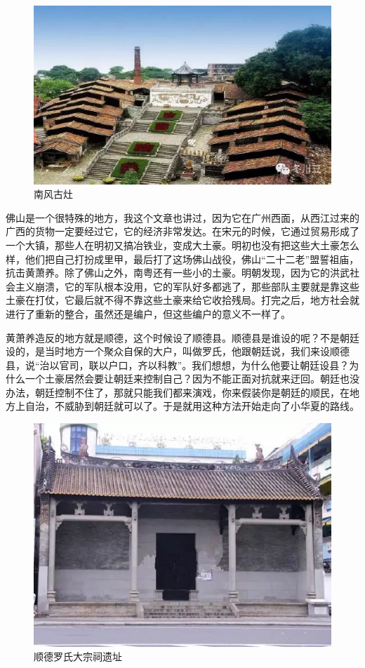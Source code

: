 \begin{figure}
	\centering
	\includegraphics[width=\textwidth]{images/image-50}
	\caption{南风古灶}
\end{figure}

佛山是一个很特殊的地方，我这个文章也讲过，因为它在广州西面，从西江过来的广西的货物一定要经过它，它的经济非常发达。在宋元的时候，它通过贸易形成了一个大镇，那些人在明初又搞冶铁业，变成大土豪。明初也没有把这些大土豪怎么样，他们把自己打扮成里甲，最后打了这场佛山战役，佛山“二十二老”盟誓祖庙，抗击黄萧养。除了佛山之外，南粤还有一些小的土豪。明朝发现，因为它的洪武社会主义崩溃，它的军队根本没用，它的军队好多都逃了，那些部队主要就是靠这些土豪在打仗，它最后就不得不靠这些土豪来给它收拾残局。打完之后，地方社会就进行了重新的整合，虽然还是编户，但这些编户的意义不一样了。

黄萧养造反的地方就是顺德，这个时候设了顺德县。顺德县是谁设的呢？不是朝廷设的，是当时地方一个聚众自保的大户，叫做罗氏，他跟朝廷说，我们来设顺德县，说“治以官司，联以户口，齐以科教”。我们想想，为什么他要让朝廷设县？为什么一个土豪居然会要让朝廷来控制自己？因为不能正面对抗就来迂回。朝廷也没办法，朝廷控制不住了，那就只能我们都来演戏，你来假装你是朝廷的顺民，在地方上自治，不威胁到朝廷就可以了。于是就用这种方法开始走向了小华夏的路线。

\begin{figure}
	\centering
	\includegraphics[width=\textwidth]{images/image-51}
	\caption{顺德罗氏大宗祠遗址}
\end{figure}


